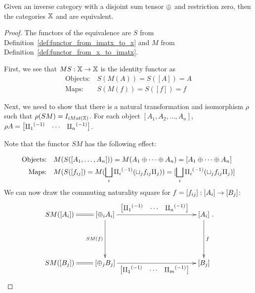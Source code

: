 \begin{proposition}\label{pro:x_and_imatx_are_equivalent}
  Given an inverse category \X with a disjoint sum tensor $\oplus$ and restriction zero, then the
  categories $\mathbb{X}$ and \imatx are equivalent.
\end{proposition}
\begin{proof}
  The functors of the equivalence are $S$ from Definition~\ref{def:functor_from_imatx_to_x} and
  $M$ from Definition~\ref{def:functor_from_x_to_imatx}.

  First, we see that $M S:\mathbb{X} \to \mathbb{X}$ is the identity functor as
  \begin{align*}
    \text{Objects:}\ &S(M(A)) = S([A]) = A\\
    \text{Maps:}\ &S(M(f)) = S([f]) = f
  \end{align*}

  Next, we need to show that there is a natural transformation and isomorphism $\rho$ such that
  $\rho(S M) = I_{iMat({\mathbb{X}})}$. For each object $[A_1,A_2,\ldots,A_n]$,
  $\rho A = \begin{bmatrix}{\amalg_{1}}^{(-1)}& \cdots &{\amalg_{n}}^{(-1)}\end{bmatrix}$.

  Note that the functor $S M$ has the following effect:

  \begin{align*}
    \text{Objects:}\quad &M(S([A_1,\ldots, A_n])) = M(A_1\oplus\cdots\oplus A_n) =
      [A_1\oplus\cdots\oplus A_n]\\
    \text{Maps:}\quad &M(S([f_{ij}]) = M(\bigsqcup_i {\amalg_{i}}^{(-1)} (\sqcup_j f_{ij} \amalg_{j}))
      = [\bigsqcup_i {\amalg_{i}}^{(-1)} (\sqcup_j f_{ij} \amalg_{j})]
  \end{align*}
  We can now draw the commuting naturality square for $f=[f_{ij}]:[A_i]\to [B_j]$:
  \[
    \xymatrix{
      SM([A_i]) \ar@{=}[r] & [\+_i A_i]
          \ar[rrrr]^{\begin{bmatrix}\icpa& \cdots &\icp{n}\end{bmatrix}}
          \ar[dd]_{SM(f)}
          & &&& [A_i] \ar[dd]^{f}\\
        &&&&&  \\
      SM([B_j]) \ar@{=}[r] & [\+_j B_j]
          \ar[rrrr]_{\begin{bmatrix}\icpa& \cdots &\icp{m}\end{bmatrix}}
          & &&& [B_j] \\
    }.
  \]


\end{proof}
